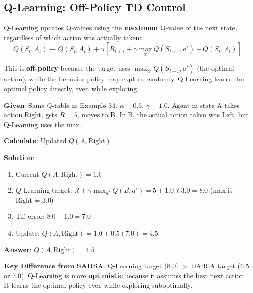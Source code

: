 \documentclass[11pt,a4paper]{article}
\begin{document}
\subsection{Q-Learning: Off-Policy TD Control}

Q-Learning updates Q-values using the \textbf{maximum} Q-value of the next state, regardless of which action was actually taken:
\[
Q(S_t, A_t) \leftarrow Q(S_t, A_t) + \alpha [R_{t+1} + \gamma \max_{a'} Q(S_{t+1}, a') - Q(S_t, A_t)]
\]

This is \textbf{off-policy} because the target uses $\max_{a'} Q(S_{t+1}, a')$ (the optimal action), while the behavior policy may explore randomly. Q-Learning learns the optimal policy directly, even while exploring.

\begin{tcolorbox}[colback=blue!5!white,colframe=blue!75!black,title=\textbf{Worked Example 37: Q-Learning Update}]
\textbf{Given}: Same Q-table as Example 34. $\alpha = 0.5$, $\gamma = 1.0$. Agent in state A takes action Right, gets $R = 5$, moves to B. In B, the actual action taken was Left, but Q-Learning uses the max.

\textbf{Calculate}: Updated $Q(A, \text{Right})$.

\textbf{Solution}:
\begin{enumerate}
    \item Current $Q(A, \text{Right}) = 1.0$
    \item $Q$-Learning target: $R + \gamma \max_{a'} Q(B, a') = 5 + 1.0 \times 3.0 = 8.0$ (max is Right = 3.0)
    \item TD error: $8.0 - 1.0 = 7.0$
    \item Update: $Q(A, \text{Right}) = 1.0 + 0.5(7.0) = 4.5$
\end{enumerate}

\textbf{Answer}: $Q(A, \text{Right}) = 4.5$

\textbf{Key Difference from SARSA}: Q-Learning target (8.0) $>$ SARSA target (6.5 or 7.0). Q-Learning is more \textbf{optimistic} because it assumes the best next action. It learns the optimal policy even while exploring suboptimally.
\end{tcolorbox}
\end{document}
